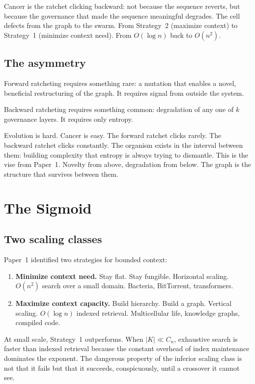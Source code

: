 \documentclass[11pt]{article}
\theoremstyle{definition}
\begin{document}
Cancer is the ratchet clicking backward: not because the sequence
reverts, but because the governance that made the sequence
meaningful degrades. The cell defects from the graph to the swarm.
From Strategy~2 (maximize context) to Strategy~1 (minimize context
need). From $O(\log n)$ back to $O(n^2)$.

\subsection{The asymmetry}

Forward ratcheting requires something rare: a mutation that enables
a novel, beneficial restructuring of the graph. It requires signal
from outside the system.

Backward ratcheting requires something common: degradation of any
one of $k$ governance layers. It requires only entropy.

Evolution is hard. Cancer is easy. The forward ratchet clicks rarely.
The backward ratchet clicks constantly. The organism exists in the
interval between them: building complexity that entropy is always
trying to dismantle. This is the vise from Paper~1. Novelty from
above, degradation from below. The graph is the structure that
survives between them.

\section{The Sigmoid}
\label{sec:sigmoid}

\subsection{Two scaling classes}

Paper~1 identified two strategies for bounded context:
\begin{enumerate}
\item \textbf{Minimize context need.} Stay flat. Stay fungible.
   Horizontal scaling. $O(n^2)$ search over a small domain.
   Bacteria, BitTorrent, transformers.
\item \textbf{Maximize context capacity.} Build hierarchy. Build
   a graph. Vertical scaling. $O(\log n)$ indexed retrieval.
   Multicellular life, knowledge graphs, compiled code.
\end{enumerate}

At small scale, Strategy~1 outperforms. When $|K| \ll C_n$,
exhaustive search is faster than indexed retrieval because the
constant overhead of index maintenance dominates the exponent.
The dangerous property of the inferior scaling class is not that it
fails but that it succeeds, conspicuously, until a crossover it
cannot see.
\end{document}
